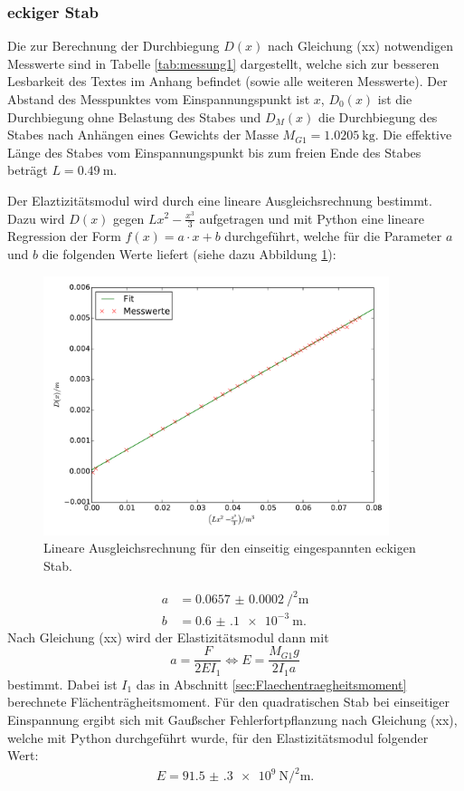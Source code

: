 \subsubsection{eckiger Stab}
Die zur Berechnung der Durchbiegung $D(x)$ nach Gleichung (xx) notwendigen Messwerte
sind in Tabelle \ref{tab:messung1} dargestellt, welche sich zur besseren Lesbarkeit
des Textes im Anhang befindet (sowie alle weiteren Messwerte).\newline
Der Abstand des Messpunktes vom Einspannungspunkt ist $x$, $D_0(x)$ ist die
Durchbiegung ohne Belastung des Stabes und $D_M(x)$ die Durchbiegung des Stabes
nach Anhängen eines Gewichts der Masse $M_{G1} = \SI{1.0205}{\kilo\gram}$. Die
effektive Länge des Stabes vom Einspannungspunkt bis zum freien Ende des Stabes
beträgt $L = \SI{0.49}{\meter}$.

Der Elaztizitätsmodul wird durch eine lineare Ausgleichsrechnung bestimmt. Dazu
wird $D(x)$ gegen $L x^2 - \frac{x^3}{3}$ aufgetragen und mit Python eine lineare
Regression der Form $f(x) = a \cdot x + b$ durchgeführt, welche für die Parameter
$a$ und $b$ die folgenden Werte liefert (siehe dazu Abbildung
\ref{fig:plot_einseitig1}):
\begin{figure}
  \centering
  \includegraphics[width=0.9\textwidth]{stab1_einseitig.pdf}
  \caption{Lineare Ausgleichsrechnung für den einseitig eingespannten eckigen Stab.}
  \label{fig:plot_einseitig1}
\end{figure}
\begin{align*}
  a &= \SI{0.0657(2)}{\per\squared\meter} \\
  b &= \SI{0.6(1)e-3}{\meter}.
\end{align*}
Nach Gleichung (xx) wird der Elastizitätsmodul dann mit
\begin{equation}
  a = \frac{F}{2 E I_1} \iff E = \frac{M_{G1} g}{2 I_1 a}
  \label{eqn:Emodul1}
\end{equation}
bestimmt. Dabei ist $I_1$ das in Abschnitt \ref{sec:Flaechentraegheitsmoment}
berechnete Flächenträgheitsmoment. Für den quadratischen Stab bei einseitiger
Einspannung ergibt sich mit Gaußscher Fehlerfortpflanzung nach Gleichung (xx),
welche mit Python durchgeführt wurde, für den Elastizitätsmodul folgender Wert:
\begin{align*}
  E = \SI{91.5(3)e+9}{\newton\per\squared\meter}.
\end{align*}


